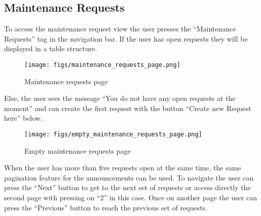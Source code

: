 \documentclass[conference]{IEEEtran}
\begin{document}
\subsection{Maintenance Requests}
To access the maintenance request view the user presses the “Maintenance Requests” tag in the navigation bar. If the user has open requests they will be displayed in a table structure.
\begin{figure}[H]
\centering
\texttt{[image: figs/maintenance\_requests\_page.png]}
\caption{Maintenance requests page}
\label{fig:Maintenance requests page}
\end{figure}
Else, the user sees the message “You do not have any open requests at the moment” and can create the first request with the button “Create new Request here” below.
\begin{figure}[H]
\centering
\texttt{[image: figs/empty\_maintenance\_requests\_page.png]}
\caption{Empty maintenance requests page}
\label{fig:Empty maintenance requests page}
\end{figure}
When the user has more than five requests open at the same time, the same pagination feature for the announcements can be used. To navigate the user can press the “Next” button to get to the next set of requests or access directly the second page with pressing on “2” in this case. Once on another page the user can press the “Previous” button to reach the previous set of requests.
\end{document}
